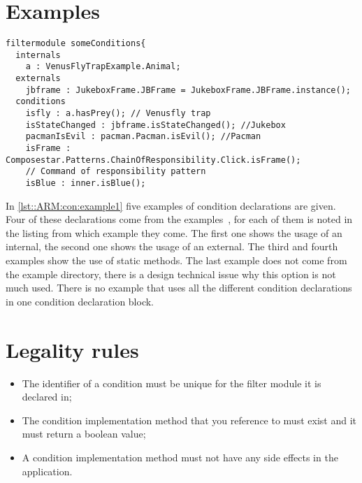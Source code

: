 \section{Examples}
\begin{lstlisting}[caption={Some condition declarations combined},label=lst::ARM:con:example1,style=listing,language=ComposeStar,float=tpb]
filtermodule someConditions{
  internals
    a : VenusFlyTrapExample.Animal;
  externals
    jbframe : JukeboxFrame.JBFrame = JukeboxFrame.JBFrame.instance();
  conditions
    isfly : a.hasPrey(); // Venusfly trap
    isStateChanged : jbframe.isStateChanged(); //Jukebox
    pacmanIsEvil : pacman.Pacman.isEvil(); //Pacman
    isFrame : Composestar.Patterns.ChainOfResponsibility.Click.isFrame();
    // Command of responsibility pattern
    isBlue : inner.isBlue();
\end{lstlisting}
In \autoref{lst::ARM:con:example1} five examples of condition declarations are given. 
Four of these declarations come from the \Compose* examples~\cite{Composestar}, for each of them is noted in the listing from which example they come. 
The first one shows the usage of an internal, the second one shows the usage of an external.
The third and fourth examples show the use of static methods.
The last example does not come from the example directory, there is a design technical issue why this option is not much used.
There is no example that uses all the different condition declarations in one condition declaration block.

\section*{Legality rules}
\begin{itemize}[noitemsep]
\item The identifier of a condition must be unique for the filter module it is declared in;
\item The condition implementation method that you reference to must exist and it must return a boolean value;
\item A condition implementation method must not have any side effects in the application.
\end{itemize}


\comments{}
